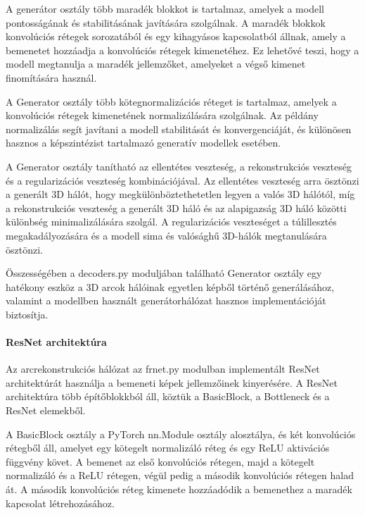 \documentclass[12pt,a4]{article}
\begin{document}
             A generátor osztály több maradék blokkot is tartalmaz, amelyek a modell pontosságának és stabilitásának javítására szolgálnak. 
             A maradék blokkok konvolúciós rétegek sorozatából és egy kihagyásos kapcsolatból állnak, amely a bemenetet hozzáadja a konvolúciós rétegek kimenetéhez.
             Ez lehetővé teszi, hogy a modell megtanulja a maradék jellemzőket, amelyeket a végső kimenet finomítására használ.
             
             A Generator osztály több kötegnormalizációs réteget is tartalmaz, amelyek a konvolúciós rétegek kimenetének normalizálására szolgálnak.
             Az példány normalizálás segít javítani a modell stabilitását és konvergenciáját, és különösen hasznos a képszintézist tartalmazó generatív modellek esetében.
             
             A Generator osztály tanítható az ellentétes veszteség, a rekonstrukciós veszteség és a regularizációs veszteség kombinációjával.
             Az ellentétes veszteség arra ösztönzi a generált 3D hálót, hogy megkülönböztethetetlen legyen a valós 3D hálótól, míg a rekonstrukciós veszteség a generált 3D háló és az alapigazság 3D háló közötti különbség minimalizálására szolgál. 
             A regularizációs veszteséget a túlillesztés megakadályozására és a modell sima és valósághű 3D-hálók megtanulására ösztönzi.
             
             Összességében a decoders.py moduljában található Generator osztály egy hatékony eszköz a 3D arcok hálóinak egyetlen képből történő generálásához,
             valamint a modellben használt generátorhálózat hasznos implementációját biztosítja.
                     
         \paragraph{ResNet architektúra}

            Az arcrekonstrukciós hálózat az frnet.py modulban implementált ResNet architektúrát használja a bemeneti képek jellemzőinek kinyerésére. 
            A ResNet architektúra több építőblokkból áll, köztük a BasicBlock, a Bottleneck és a ResNet elemekből.
            
            A BasicBlock osztály a PyTorch nn.Module osztály alosztálya, és két konvolúciós rétegből áll, amelyet egy kötegelt normalizáló réteg és egy ReLU aktivációs függvény követ.
            A bemenet az első konvolúciós rétegen, majd a kötegelt normalizáló és a ReLU rétegen, végül pedig a második konvolúciós rétegen halad át. 
            A második konvolúciós réteg kimenete hozzáadódik a bemenethez a maradék kapcsolat létrehozásához.
            
\end{document}
